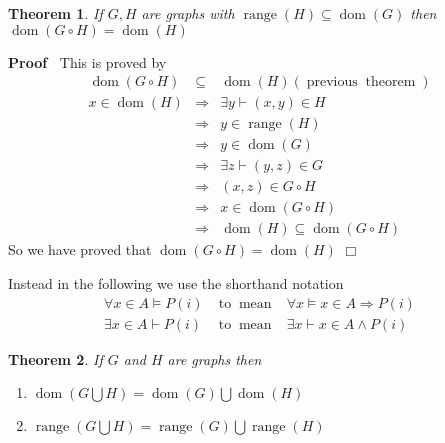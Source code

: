 \documentclass{book}
\newcommand{\tmop}[1]{\ensuremath{\operatorname{#1}}}
\newenvironment{proof}{\noindent\textbf{Proof\ }}{\hspace*{\fill}$\Box$\medskip}
\newtheorem{theorem}{Theorem}
\begin{document}
{{\begin{theorem}
  \label{domain property of composition}If $G, H$ are graphs with
  $\tmop{range} (H) \subseteq \tmop{dom} (G)$ then $\tmop{dom} (G \circ H) =
  \tmop{dom} (H)$
\end{theorem}

\begin{proof}
  This is proved by
  \begin{eqnarray*}
    \tmop{dom} (G \circ H) & \subseteq & \tmop{dom} (H)  (\tmop{previous}
    \tmop{theorem})\\
    x \in \tmop{dom} (H) & \Rightarrow & \exists y \vdash (x, y) \in H\\
    & \Rightarrow & y \in \tmop{range} (H)\\
    & \Rightarrow & y \in \tmop{dom} (G)\\
    & \Rightarrow & \exists z \vdash (y, z) \in G\\
    & \Rightarrow & (x, z) \in G \circ H\\
    & \Rightarrow & x \in \tmop{dom} (G \circ H)\\
    & \Rightarrow & \tmop{dom} (H) \subseteq \tmop{dom} (G \circ H)
  \end{eqnarray*}
  So we have proved that $\tmop{dom} (G \circ H) = \tmop{dom} (H)$
\end{proof}

\begin{note}
  Instead in the following we use the shorthand notation
  \begin{eqnarray*}
    \forall x \in A \vDash P (i) & \tmop{to} \tmop{mean} & \forall x \vDash x
    \in A \Rightarrow P (i)\\
    \exists x \in A \vdash P (i) & \tmop{to} \tmop{mean} & \exists x \vdash x
    \in A \wedge P (i)
  \end{eqnarray*}
\end{note}

\begin{theorem}
  \label{union of two graphs}If $G$ and $H$ are graphs then
  \begin{enumerate}
    \item $\tmop{dom} \left( G \bigcup H \right) = \tmop{dom} (G) \bigcup
    \tmop{dom} (H)$
    
    \item $\tmop{range} \left( G \bigcup H \right) = \tmop{range} (G) \bigcup
    \tmop{range} (H)$
  \end{enumerate}
\end{theorem}

}}
\end{document}

